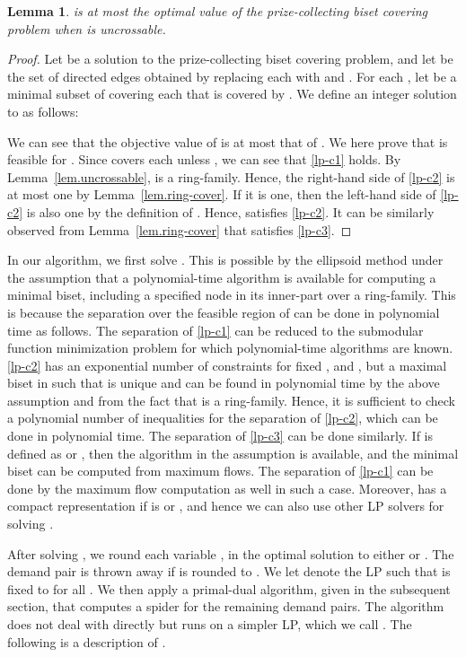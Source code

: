 \documentclass[11pt]{article}
\newtheorem{lemma}{Lemma}
\begin{document}
\begin{lemma}\label{lem.relaxation}
  is at most the optimal value of the prize-collecting
 biset covering problem when  is uncrossable.
 \end{lemma}
\begin{proof}
 Let  be a solution to the prize-collecting
 biset covering problem, and 
 let  be the set of directed edges obtained by replacing each
  with  and .
 For each ,
 let  be a minimal subset of 
 covering each  that is covered by .
 We define an integer solution  to  as follows:
 

We can see that the objective value of  is at
most that of . We here prove that  is
 feasible for .
 Since  covers each  unless ,
 we can see that \eqref{lp-c1} holds.
 By Lemma~\ref{lem.uncrossable}, 
  is a ring-family.
 Hence, the right-hand side of \eqref{lp-c2} is at most one by
 Lemma~\ref{lem.ring-cover}.
 If it is one, then the left-hand side of \eqref{lp-c2} is also one 
 by the definition of . Hence,  satisfies \eqref{lp-c2}.
 It can be similarly observed from Lemma~\ref{lem.ring-cover}
 that  satisfies \eqref{lp-c3}.
\end{proof}


In our algorithm, we first solve .
This is possible by the ellipsoid method 
under the assumption that 
a polynomial-time algorithm is available for computing
a minimal biset, including a specified node in its inner-part
over a ring-family.
This is
because the separation over the feasible region of  can be
done in polynomial time as follows.
The separation of \eqref{lp-c1} can be reduced to the submodular
function minimization problem for which polynomial-time algorithms are
known.
\eqref{lp-c2} has an exponential number of constraints for fixed ,  and ,
but a maximal biset in  such that  is
unique and can be found in polynomial time by the above assumption and
from the fact that  is a ring-family.
Hence, it is sufficient to check a polynomial number of inequalities for the
separation of \eqref{lp-c2}, which can be done in
polynomial time.
The separation of \eqref{lp-c3} can be done similarly.
If  is defined as  or
,
then the algorithm in the assumption is available, and the minimal biset can
be computed from maximum flows.
The separation of \eqref{lp-c1} can be done by the maximum flow
computation as well in such a case.
Moreover,  has a compact representation if
 is  or , 
and hence we can also use other LP solvers for solving
.

After solving , we round
each variable ,  
in the optimal solution
to either  or .
The demand pair  is thrown away if  is rounded to
.
We let  denote the LP such that 
 is fixed to  for all .
We then apply a primal-dual algorithm, given in the subsequent section, that
computes a spider for the remaining demand pairs.
The algorithm does not deal with  directly but
runs on a simpler LP, which we call .
The following is a description of .
\end{document}
